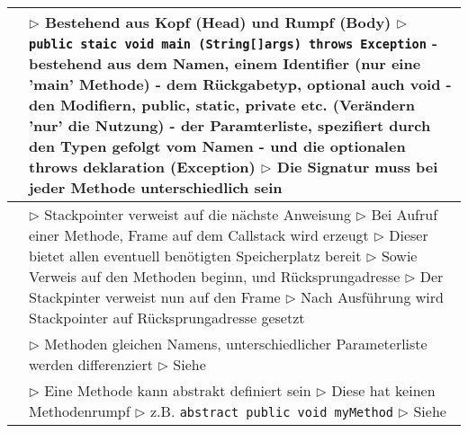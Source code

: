 	\begin{table}[H]
	\label{Methoden}
	\begin{tabular}{ | p{4cm} p{13.5cm} | }
	

	\hline
	\makecell[l]{Aufbau} &
	\makecell[l]
	{
	$\rhd$ Bestehend aus Kopf (Head) und Rumpf (Body) \\
	$\rhd$ \texttt{public staic void main (String[]args) throws Exception} \\
	\hspace{0.4cm} - bestehend aus dem Namen, einem Identifier (nur eine 'main' Methode) \\
	\hspace{0.4cm} - dem Rückgabetyp, optional auch void \\
	\hspace{0.4cm} - den Modifiern, public, static, private etc. (Verändern 'nur' die Nutzung) \\
	\hspace{0.4cm} - der Paramterliste, spezifiert durch den Typen gefolgt vom Namen\\
	\hspace{0.4cm} - und die optionalen throws deklaration (Exception) \\
	$\rhd$ Die Signatur muss bei jeder Methode unterschiedlich sein
	} 	\\ \hline
	
	
	\makecell[l]{Ausfürung} & 
	\makecell[l]
	{
	$\rhd$ Stackpointer verweist auf die nächste Anweisung \\
	$\rhd$ Bei Aufruf einer Methode, Frame auf dem Callstack wird 
	erzeugt\\
	$\rhd$ Dieser bietet allen eventuell benötigten Speicherplatz 
	bereit \\
	$\rhd$ Sowie Verweis auf den Methoden beginn, und 
	Rücksprungadresse \\
	$\rhd$ Der Stackpinter verweist nun auf den Frame \\
	$\rhd$ Nach Ausführung wird Stackpointer auf 
	Rücksprungadresse gesetzt \\
	} 	\\ \hline
	
	
	\makecell[l]{Overloading} & 
	\makecell[l]
	{
	$\rhd$ Methoden gleichen Namens, unterschiedlicher Parameterliste
	werden differenziert \\
	$\rhd$ Siehe \underline{\nameref{Vererbung}}
	} 	\\ \hline
	
	
	\makecell[l]{Abtraktion} & 
	\makecell[l]
	{
	$\rhd$ Eine Methode kann abstrakt definiert sein \\
	$\rhd$ Diese hat keinen Methodenrumpf \\
	$\rhd$ z.B. \texttt{abstract public void myMethod} \\
	$\rhd$ Siehe \underline{\nameref{Klassen}}
	} 	\\ \hline



\end{tabular}
\end{table}
